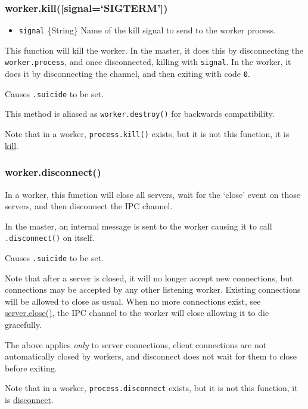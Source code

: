 \subsubsection{worker.kill({[}signal=`SIGTERM'{]})}\label{worker.killsignalsigterm}

\begin{itemize}
\itemsep1pt\parskip0pt
\item
  \texttt{signal} \{String\} Name of the kill signal to send to the
  worker process.
\end{itemize}

This function will kill the worker. In the master, it does this by
disconnecting the \texttt{worker.process}, and once disconnected,
killing with \texttt{signal}. In the worker, it does it by disconnecting
the channel, and then exiting with code \texttt{0}.

Causes \texttt{.suicide} to be set.

This method is aliased as \texttt{worker.destroy()} for backwards
compatibility.

Note that in a worker, \texttt{process.kill()} exists, but it is not
this function, it is
\href{process.html\#process_process_kill_pid_signal}{kill}.

\subsubsection{worker.disconnect()}\label{worker.disconnect}

In a worker, this function will close all servers, wait for the `close'
event on those servers, and then disconnect the IPC channel.

In the master, an internal message is sent to the worker causing it to
call \texttt{.disconnect()} on itself.

Causes \texttt{.suicide} to be set.

Note that after a server is closed, it will no longer accept new
connections, but connections may be accepted by any other listening
worker. Existing connections will be allowed to close as usual. When no
more connections exist, see
\href{net.html\#net_event_close}{server.close()}, the IPC channel to the
worker will close allowing it to die gracefully.

The above applies \emph{only} to server connections, client connections
are not automatically closed by workers, and disconnect does not wait
for them to close before exiting.

Note that in a worker, \texttt{process.disconnect} exists, but it is not
this function, it is
\href{child_process.html\#child_process_child_disconnect}{disconnect}.

